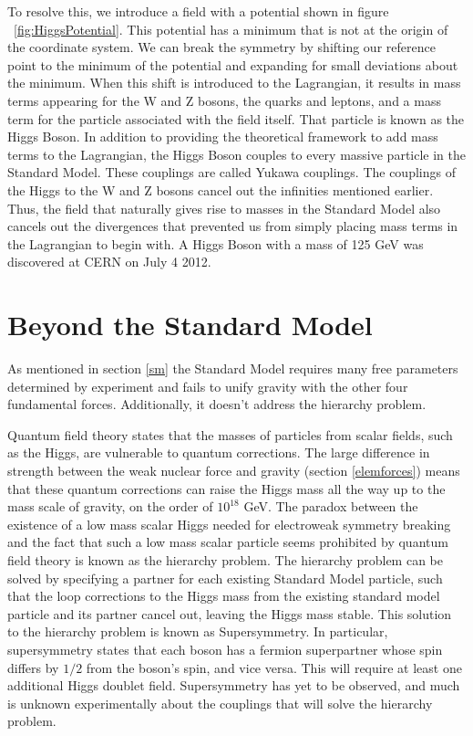 \documentclass[oneside, letterpaper, oldfontcommands]{memoir}
\begin{document}
\qquad To resolve this, we introduce a field with a potential shown in figure ~\ref{fig:HiggsPotential}. This potential has a minimum that is not at the origin of the coordinate system. We can break the symmetry by shifting our reference point to the minimum of the potential and expanding for small deviations about the minimum. When this shift is introduced to the Lagrangian, it results in mass terms appearing for the W and Z bosons, the quarks and leptons, and a mass term for the particle associated with the field itself. That particle is known as the Higgs Boson. In addition to providing the theoretical framework to add mass terms to the Lagrangian, the Higgs Boson couples to every massive particle in the Standard Model. These couplings are called Yukawa couplings. The couplings of the Higgs to the W and Z bosons cancel out the infinities mentioned earlier.\cite{Halzen:1984mc} Thus, the field that naturally gives rise to masses in the Standard Model also cancels out the divergences that prevented us from simply placing mass terms in the Lagrangian to begin with. A Higgs Boson with a mass of 125 GeV was discovered at CERN on July 4 2012. \cite{Agashe:2014kda}
 

\section{Beyond the Standard Model}\label{BSM}

\qquad As mentioned in section \ref{sm} the Standard Model requires many free parameters determined by experiment and fails to unify gravity with the other four fundamental forces. Additionally, it doesn't address the hierarchy problem\cite{ArkaniHamed:1998rs}. 

Quantum field theory states that the masses of particles from scalar fields, such as the Higgs, are vulnerable to quantum corrections. The large difference in strength between the weak nuclear force and gravity (section \ref{elemforces}) means that these quantum corrections can raise the Higgs mass all the way up to the mass scale of gravity, on the order of $10^{18}$ GeV. The paradox between the existence of a low mass scalar Higgs needed for electroweak symmetry breaking and the fact that such a low mass scalar particle seems prohibited by quantum field theory is known as the hierarchy problem. The hierarchy problem can be solved by specifying a partner for each existing Standard Model particle, such that the loop corrections to the Higgs mass from the existing standard model particle and its partner cancel out, leaving the Higgs mass stable. This solution to the hierarchy problem is known as Supersymmetry. In particular, supersymmetry states that each boson has a fermion superpartner whose spin differs by $1/2$ from the boson's spin, and vice versa. This will require at least one additional Higgs doublet field\cite{Csaki:1996ks}. Supersymmetry has yet to be observed, and much is unknown experimentally about the couplings that will solve the hierarchy problem. 
\end{document}
